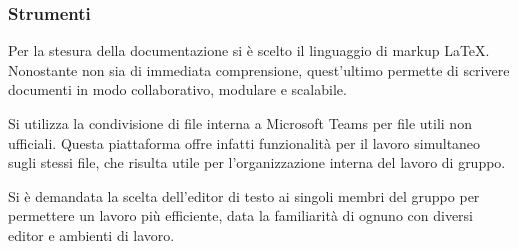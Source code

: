     \subsubsection{Strumenti}
      \subsubsubsection{\LaTeX}
        Per la stesura della documentazione si è scelto il linguaggio di markup \LaTeX{}. Nonostante non sia di immediata comprensione, quest'ultimo permette di scrivere documenti in modo collaborativo, modulare e scalabile.

        Si utilizza la condivisione di file interna a Microsoft Teams per file utili non ufficiali. Questa piattaforma offre infatti funzionalità per il lavoro simultaneo sugli stessi file, che risulta utile per l'organizzazione interna del lavoro di gruppo.

        Si è demandata la scelta dell'editor di testo ai singoli membri del gruppo per permettere un lavoro più efficiente, data la familiarità di ognuno con diversi editor e ambienti di lavoro.
